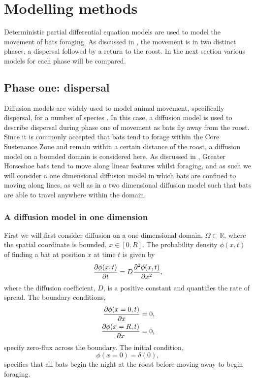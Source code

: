 \section{Modelling methods}
%
Deterministic partial differential equation models are used to model the movement of bats foraging. As discussed in , the movement is in two distinct phases, a dispersal followed by a return to the roost. In the next section various models for each phase will be compared.

\subsection{Phase one: dispersal} \label{phase1}

Diffusion models are widely used to model animal movement, specifically dispersal, for a number of
species \cite{Ovaskainen2016}. In this case, a diffusion model is used to
describe dispersal during phase one of movement as bats fly away from the roost. Since it is commonly accepted that bats tend
to forage within the Core Sustenance Zone and remain within a certain distance
 of the roost, a diffusion model on a bounded domain is considered here. As discussed in , Greater Horseshoe bats tend to move along linear features whilst foraging, and as such we will consider a one dimensional diffusion model in which bats are confined to moving along lines, as well as in a two dimensional diffusion model such that bats are able to travel anywhere within the domain.

 \subsubsection{A diffusion model in one dimension}

First we will first consider diffusion on a one  dimensional domain, $\Omega \subset \mathbb{R}$, where the spatial coordinate is bounded, $x \in [0,R]$.  The probability density $\phi(x,t)$ of finding a bat at position $x$ at time $t$ is given by
 \begin{equation}
   \frac{\partial \phi(x,t)}{\partial t} = D \frac{\partial^2 \phi(x,t)}{\partial x^2} ,
   \label{eqn:diffusion_cartesian}
 \end{equation}
 where the diffusion coefficient, $D$, is a positive constant and quantifies the rate of spread. The boundary conditions,
\begin{align}
\frac{\partial \phi(x=0,t)}{\partial x} &= 0, \\
\frac{\partial \phi(x=R,t)}{\partial x} &= 0,
\label{eqn:BC1d}
\end{align}
%
specify zero-flux across the boundary. The initial condition,
%
\begin{equation}
\phi(x = 0) = \delta(0),
\label{eqn:IC1d}
\end{equation}
%
specifies that all bats begin the night at the roost before moving away to begin foraging.
%
